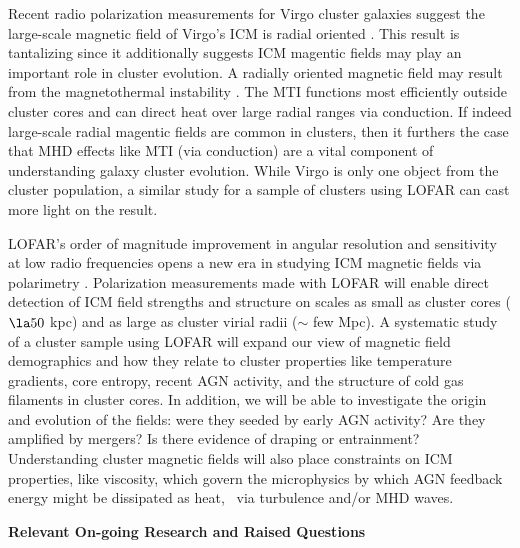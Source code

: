\documentclass[12pt]{article}
\begin{document}
Recent radio polarization measurements for Virgo cluster galaxies
suggest the large-scale magnetic field of Virgo's ICM is radial
oriented \cite{2009arXiv0911.2476P}. This result is tantalizing since
it additionally suggests ICM magentic fields may play an important
role in cluster evolution. A radially oriented magnetic field may
result from the magnetothermal instability
\cite[MTI,][]{2000ApJ...534..420B}. The MTI functions most efficiently
outside cluster cores and can direct heat over large radial ranges via
conduction. If indeed large-scale radial magentic fields are common in
clusters, then it furthers the case that MHD effects like MTI (via
conduction) are a vital component of understanding galaxy cluster
evolution. While Virgo is only one object from the cluster population,
a similar study for a sample of clusters using LOFAR can cast more
light on the \cite{2009arXiv0911.2476P} result.

LOFAR's order of magnitude improvement in angular resolution and
sensitivity at low radio frequencies opens a new era in studying ICM
magnetic fields via polarimetry
\cite{2009ASPC..407...33A}. Polarization measurements made with LOFAR
will enable direct detection of ICM field strengths and structure on
scales as small as cluster cores ($\la 50$ kpc) and as large as
cluster virial radii ($\sim$ few Mpc). A systematic study of a cluster
sample using LOFAR will expand our view of magnetic field demographics
and how they relate to cluster properties like temperature gradients,
core entropy, recent AGN activity, and the structure of cold gas
filaments in cluster cores. In addition, we will be able to
investigate the origin and evolution of the fields: were they seeded
by early AGN activity? Are they amplified by mergers? Is there
evidence of draping or entrainment? Understanding cluster magnetic
fields will also place constraints on ICM properties, like viscosity,
which govern the microphysics by which AGN feedback energy might be
dissipated as heat, \eg\ via turbulence and/or MHD waves.

{\bf{Relevant On-going Research and Raised Questions}}
\end{document}
